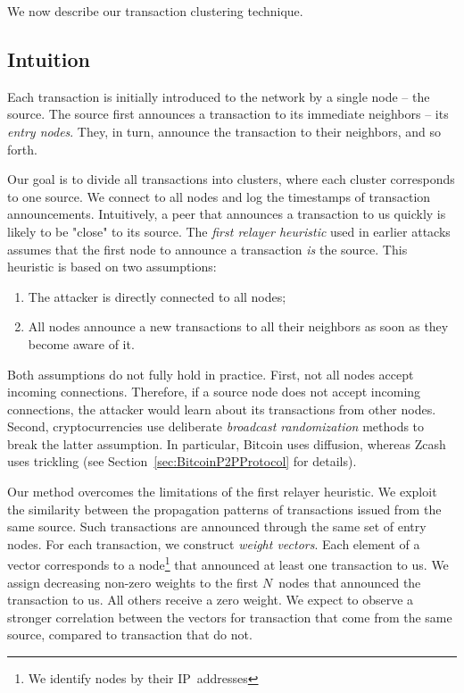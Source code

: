 We now describe our transaction clustering technique.

\subsection{Intuition}

Each transaction is initially introduced to the network by a single node -- the source.
The source first announces a transaction to its immediate neighbors -- its \textit{entry nodes}.
They, in turn, announce the transaction to their neighbors, and so forth.

Our goal is to divide all transactions into clusters, where each cluster corresponds to one source.
We connect to all nodes and log the timestamps of transaction announcements.
Intuitively, a peer that announces a transaction to us quickly is likely to be "close" to its source.
The \textit{first relayer heuristic} used in earlier attacks assumes that the first node to announce a transaction \textit{is} the source.
This heuristic is based on two assumptions:
\begin{enumerate}
	\item The attacker is directly connected to all nodes;
	\item All nodes announce a new transactions to all their neighbors as soon as they become aware of it.
\end{enumerate}
Both assumptions do not fully hold in practice.
First, not all nodes accept incoming connections.
Therefore, if a source node does not accept incoming connections, the attacker would learn about its transactions from other nodes.
Second, cryptocurrencies use deliberate \textit{broadcast randomization} methods to break the latter assumption.
In particular, Bitcoin uses diffusion, whereas Zcash uses trickling (see Section~\ref{sec:BitcoinP2PProtocol} for details).

Our method overcomes the limitations of the first relayer heuristic.
We exploit the similarity between the propagation patterns of transactions issued from the same source.
Such transactions are announced through the same set of entry nodes.
For each transaction, we construct \textit{weight vectors}.
Each element of a vector corresponds to a node\footnote{We identify nodes by their IP~addresses} that announced at least one transaction to us.
We assign decreasing non-zero weights to the first $N$~nodes that announced the transaction to us.
All others receive a zero weight.
We expect to observe a stronger correlation between the vectors for transaction that come from the same source, compared to transaction that do not.

